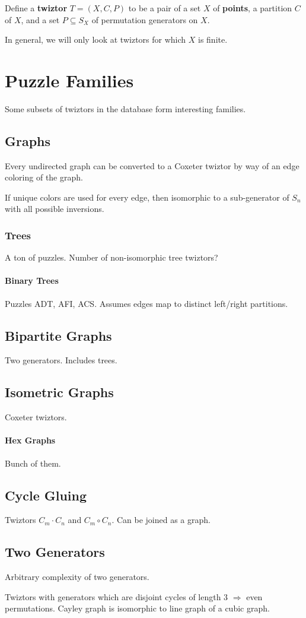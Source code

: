 \documentclass{report}
\begin{document}
Define a {\bf twiztor} $T = (X, C, P)$ to be a pair of a set $X$ of {\bf points}, a partition $C$ of $X$, and a set $P\subseteq S_X$ of permutation generators on $X$.

In general, we will only look at twiztors for which $X$ is finite.

\chapter{Puzzle Families}

Some subsets of twiztors in the database form interesting families.

\section{Graphs}

Every undirected graph can be converted to a Coxeter twiztor by way of an edge coloring of the graph.

If unique colors are used for every edge, then isomorphic to a sub-generator of $S_n$ with all possible inversions.

\subsection{Trees}

A ton of puzzles.
Number of non-isomorphic tree twiztors?

\subsubsection{Binary Trees}

Puzzles ADT, AFI, ACS.
Assumes edges map to distinct left/right partitions.

\section{Bipartite Graphs}
Two generators.
Includes trees.

\section{Isometric Graphs}
Coxeter twiztors.

\subsubsection{Hex Graphs}
Bunch of them.

\section{Cycle Gluing}
Twiztors $C_m\cdot C_n$ and $C_m\circ C_n$.  Can be joined as a graph.

\section{Two Generators}

Arbitrary complexity of two generators.

Twiztors with generators which are disjoint cycles of length $3$ $\Rightarrow $ even permutations.
Cayley graph is isomorphic to line graph of a cubic graph.
\end{document}
